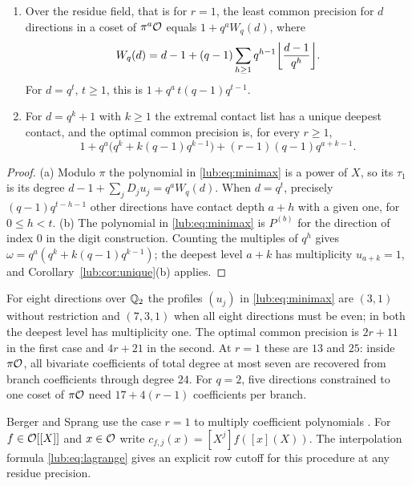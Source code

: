 \begin{corollary}\label{lub:cor:optimum}
\begin{enumerate}[label=\textup{(\alph*)}]
\item Over the residue field, that is for $r=1$, the least common precision for $d$
directions in a coset of $\pi^a\mathcal{O}$ equals $1+q^aW_q(d)$, where
\[
 W_q(d)=d-1+(q-1)\sum_{h\ge1}q^{h-1}\floor*{\frac{d-1}{q^h}} .
\]
For $d=q^t$, $t\ge1$, this is $1+q^a\,t(q-1)q^{t-1}$.
\item For $d=q^k+1$ with $k\ge1$ the extremal contact list has a unique deepest contact,
and the optimal common precision is, for every $r\ge1$,
\[
 1+q^a\bigl(q^k+k(q-1)q^{k-1}\bigr)+(r-1)(q-1)q^{a+k-1}.
\]
\end{enumerate}
\end{corollary}
\begin{proof}
(a) Modulo $\pi$ the polynomial in \eqref{lub:eq:minimax} is a power of $X$, so its
$\tau_1$ is its degree $d-1+\sum_jD_ju_j=q^aW_q(d)$. When $d=q^t$, precisely $(q-1)q^{t-h-1}$ other
directions have contact depth $a+h$ with a given one, for $0\le h<t$.
(b) The polynomial in \eqref{lub:eq:minimax} is $P^{(b)}$ for the direction of index $0$
in the digit construction. Counting the multiples of $q^h$ gives
$\omega=q^a(q^k+k(q-1)q^{k-1})$; the deepest level $a+k$ has multiplicity $u_{a+k}=1$, and
Corollary~\ref{lub:cor:unique}(b) applies.
\end{proof}

\begin{example}\label{lub:ex:eight}
For eight directions over $\mathbb{Q}_2$ the profiles $(u_j)$ in \eqref{lub:eq:minimax} are $(3,1)$
without restriction and $(7,3,1)$ when all eight directions must be even; in both the
deepest level has multiplicity one. The optimal common precision is $2r+11$ in the first
case and $4r+21$ in the second. At $r=1$ these are $13$ and $25$: inside $\pi\mathcal{O}$, all
bivariate coefficients of total degree at most seven are recovered from branch
coefficients through degree $24$. For $q=2$, five directions constrained to one coset of
$\pi\mathcal{O}$ need $17+4(r-1)$ coefficients per branch.
\end{example}

Berger and Sprang use the case $r=1$ to multiply coefficient polynomials
\cite[Theorem~4.6]{BergerSprang2025Integer}. For $f\in\mathcal{O}[[X]]$ and $x\in\mathcal{O}$ write
$c_{f,j}(x)=[X^j]f([x](X))$. The interpolation formula \eqref{lub:eq:lagrange} gives an
explicit row cutoff for this procedure at any residue precision.

